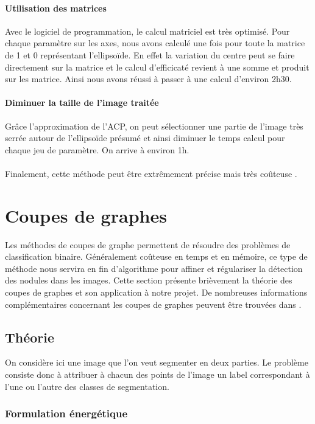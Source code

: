 \documentclass{article}
\begin{document}
\paragraph{Utilisation des matrices} Avec le logiciel de programmation, le calcul matriciel est très optimisé. Pour chaque paramètre sur les axes, nous avons calculé une fois pour toute la matrice de 1 et 0 représentant l'ellipsoïde. En effet la variation du centre peut se faire directement sur la matrice et le calcul d'efficicaté revient à une somme et produit sur les matrice. Ainsi nous avons réussi à passer à une calcul d'environ 2h30.

\paragraph{Diminuer la taille de l'image traitée} Grâce l'approximation de l'ACP, on peut sélectionner une partie de l'image très serrée autour de l'ellipsoïde présumé et ainsi diminuer le temps calcul pour chaque jeu de paramètre. On arrive à environ 1h.\\\\

Finalement, cette méthode peut être extrêmement précise mais très coûteuse .


\section{Coupes de graphes}

Les méthodes de coupes de graphe permettent de résoudre des problèmes de classification binaire. Généralement coûteuse en temps et en mémoire, ce type de méthode nous servira en fin d'algorithme pour affiner et régulariser la détection des nodules dans les images. Cette section présente brièvement la théorie des coupes de graphes et son application à notre projet. De nombreuses informations complémentaires concernant les coupes de graphes peuvent être trouvées dans \cite{bib:GC04, bib:GC05}.		

\subsection{Théorie}

On considère ici une image que l'on veut segmenter en deux parties. Le problème consiste donc à attribuer à chacun des points de l'image un label correspondant à l'une ou l'autre des classes de segmentation.

\subsubsection{Formulation énergétique}
\end{document}
